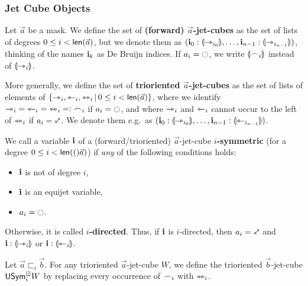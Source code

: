 \documentclass[a4paper]{memoir}
\begin{document}
\subsubsection{Jet Cube Objects}
\begin{definition} \label{def:jet-cube}
	Let $\vec a$ be a mask.
	We define the set of \textbf{(forward) $\vec{a}$-jet-cubes} as the set of lists of degrees $0 \leq i < \mathsf{len}(\vec a)$, but we denote them as
	$(\mathbf{i}_0 : {\llparenthesis \rightarrowtriangle_{i_0} \rrparenthesis}, \ldots, \mathbf{i}_{n-1} : {\llparenthesis \rightarrowtriangle_{i_{n-1}} \rrparenthesis})$, thinking of the names $\mathbf{i}_k$ as De Bruijn indices.
	If $a_i = \npolar$, we write ${\llparenthesis \frown_i \rrparenthesis}$ instead of ${\llparenthesis \rightarrowtriangle_i \rrparenthesis}$.
	
	
	More generally, we define the set of \textbf{trioriented $\vec a$-jet-cubes} as the set of lists of elements of \allowbreak $\mathopen{}\left\{ \rightarrowtriangle_i, \leftarrowtriangle_i, \leftrightarrowtriangle_i \,\middle|\, 0 \leq i < \mathsf{len}(\vec a) \right\}\mathclose{}$, where we identify ${\rightarrowtriangle_i} = {\leftarrowtriangle_i} = {\leftrightarrowtriangle_i} =: {\frown_i}$ if $a_i = \npolar$, and where $\rightarrowtriangle_i$ and $\leftarrowtriangle_i$ cannot occur to the left of $\leftrightarrowtriangle_i$ if $a_i = \ypolar$.
	We denote them e.g.\ as $(\mathbf{i}_0 : {\llparenthesis \rightarrowtriangle_{i_0} \rrparenthesis}, \ldots, \mathbf{i}_{n-1} : {\llparenthesis \leftarrowtriangle_{i_{n-1}} \rrparenthesis})$.
\end{definition}
\begin{definition} \label{def:symmetric-var}
	We call a variable $\mathbf{i}$ of a (forward/trioriented) $\vec a$-jet-cube \textbf{$i$-symmetric} (for a degree $0 \leq i < \mathsf{len}(()\vec a)$) if \emph{any} of the following conditions holds:
	\begin{itemize}
		\item $\mathbf{i}$ is not of degree $i$,
		\item $\mathbf{i}$ is an equijet variable,
		\item $a_i = \npolar$.
	\end{itemize}
	Otherwise, it is called \textbf{$i$-directed}.
	Thus, if $\mathbf{i}$ is $i$-directed, then $a_i = \ypolar$ and $\mathbf{i} : {\llparenthesis \rightarrowtriangle_i \rrparenthesis}$ or $\mathbf{i} : {\llparenthesis \leftarrowtriangle_i \rrparenthesis}$.
\end{definition}
\begin{definition} \label{def:sym-forget-cube}
	Let $\vec a \sqsubset_i \vec b$. For any trioriented $\vec a$-jet-cube $W$, we define the trioriented $\vec b$-jet-cube $\mathsf{USym}^\boxdot_i W$ by replacing every occurrence of $\frown_i$ with $\leftrightarrowtriangle_i$.
\end{definition}
\end{document}
